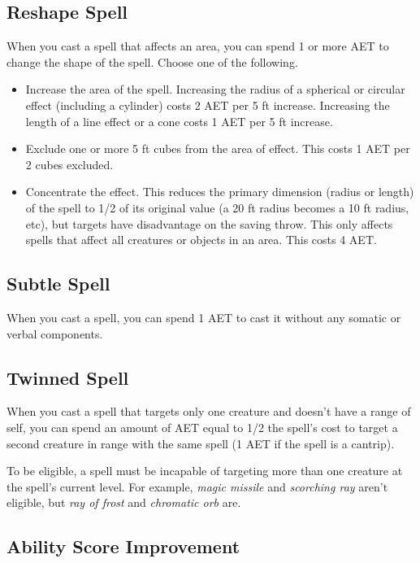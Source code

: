 \subsection{Reshape Spell}
When you cast a spell that affects an area, you can spend 1 or more AET to change the shape of the spell. Choose one of the following.
\begin{itemize}
  \item Increase the area of the spell. Increasing the radius of a spherical or circular effect (including a cylinder) costs 2 AET per 5 ft increase. Increasing the length of a line effect or a cone costs 1 AET per 5 ft increase.
  \item Exclude one or more 5 ft cubes from the area of effect. This costs 1 AET per 2 cubes excluded.
  \item Concentrate the effect. This reduces the primary dimension (radius or length) of the spell to 1/2 of its original value (a 20 ft radius becomes a 10 ft radius, etc), but targets have disadvantage on the saving throw. This only affects spells that affect all creatures or objects in an area. This costs 4 AET.
\end{itemize}

\subsection{Subtle Spell}

When you cast a spell, you can spend 1 AET to cast it without any somatic or verbal components.

\subsection{Twinned Spell}

When you cast a spell that targets only one creature and doesn't have a range of self, you can spend an amount of AET equal to 1/2 the spell's cost to target a second creature in range with the same spell (1 AET if the spell is a cantrip).

To be eligible, a spell must be incapable of targeting more than one creature at the spell's current level. For example, \textit{magic missile} and \textit{scorching ray} aren't eligible, but \textit{ray of frost} and \textit{chromatic orb} are.

\subsection{Ability Score Improvement}

